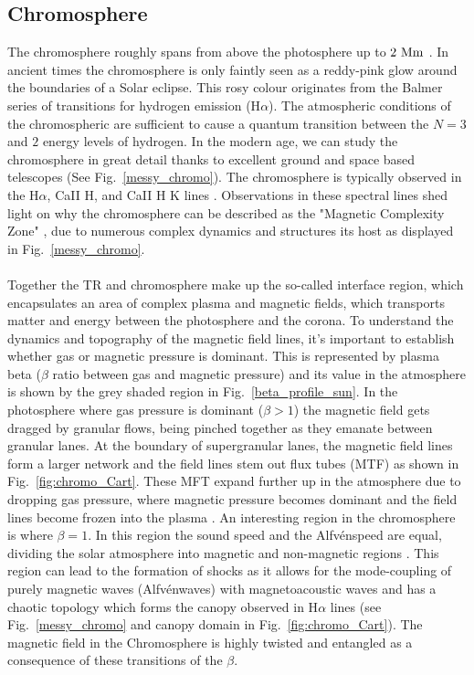 \documentclass[12pt]{ociamthesis}
\newcommand{\Alfven}{Alfv\'{e}n}
\newcommand{\np}{\\ \\}
\begin{document}
\subsection{Chromosphere}
\label{ssec:Chromosphere}
The chromosphere roughly spans from above the photosphere up to $2~\rm{Mm}$ \citep{Lang_2006ses}. In ancient times the chromosphere is only faintly seen as a reddy-pink glow around the boundaries of a Solar eclipse. This rosy colour originates from the Balmer series of transitions for hydrogen emission (H$\alpha$). The atmospheric conditions of the chromospheric are sufficient to cause a quantum transition between the $N=3$ and $2$ energy levels of hydrogen. In the modern age, we can study the chromosphere in great detail thanks to excellent ground and space based telescopes (See Fig.~\ref{messy_chromo}). The chromosphere is typically observed in the H$\alpha$, CaII H, and CaII H K lines \citep{Ayres2019sgspbook27A}. Observations in these spectral lines shed light on why the chromosphere can be described as the "Magnetic Complexity Zone" \citep{Ayres2009astro2010S9A}, due to numerous complex dynamics and structures its host as displayed in Fig.~\ref{messy_chromo}. \np  
%
Together the TR and chromosphere make up the so-called interface region, which encapsulates an area of complex plasma and magnetic fields, which transports matter and energy between the photosphere and the corona. To understand the dynamics and topography of the magnetic field lines, it's important to establish whether gas or magnetic pressure is dominant. This is represented by plasma beta ($\beta$ ratio between gas and magnetic pressure) and its value in the atmosphere is shown by the grey shaded region in Fig.~\ref{beta_profile_sun}. In the photosphere where gas pressure is dominant ($\beta>1$) the magnetic field gets dragged by granular flows, being pinched together as they emanate between granular lanes. At the boundary of supergranular lanes, the magnetic field lines form a larger network and the field lines stem out flux tubes (MTF) as shown in Fig.~\ref{fig:chromo_Cart}. These MFT expand further up in the atmosphere due to dropping gas pressure, where magnetic pressure becomes dominant and the field lines become frozen into the plasma \citep{Ayres2009astro2010S9A}. An interesting region in the chromosphere is where $\beta=1$. In this region the sound speed and the \Alfven speed are equal, dividing the solar atmosphere into magnetic and non-magnetic regions \citep{Tsiropoula2012}. This region can lead to the formation of shocks as it allows for the mode-coupling of purely magnetic waves (\Alfven waves) with magnetoacoustic waves \citep{Hollweg1982SoPh7535H, Rosenthal2002ApJ564508R,Bogdan2003ApJ599626B, Cally2008SoPh251251C, Wang2020ApJ891110W} and has a chaotic topology which forms the canopy observed in H$\alpha$ lines (see Fig.~\ref{messy_chromo} and canopy domain in Fig.~\ref{fig:chromo_Cart}). The magnetic field in the Chromosphere is highly twisted and entangled as a consequence of these transitions of the $\beta$. \np
\end{document}
